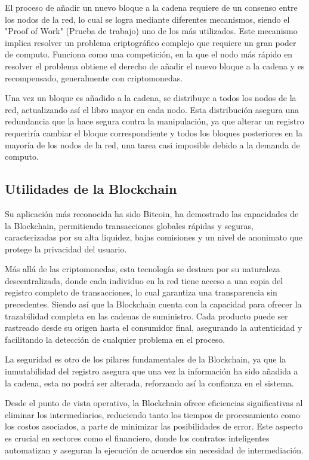 El proceso de añadir un nuevo bloque a la cadena requiere de un consenso entre los nodos de la red, lo cual se logra mediante diferentes mecanismos, siendo el "Proof of Work" (Prueba de trabajo) uno de los más utilizados. 
Este mecanismo implica resolver un problema criptográfico complejo que requiere un gran poder de computo. Funciona como una competición, en la que el nodo más rápido en resolver el problema obtiene el derecho de añadir el nuevo bloque a la cadena y es recompensado, generalmente con criptomonedas.

Una vez un bloque es añadido a la cadena, se distribuye a todos los nodos de la red, actualizando así el libro mayor en cada nodo. Esta distribución asegura una redundancia que la hace segura contra la manipulación, ya que alterar un registro requeriría cambiar el bloque correspondiente y todos los bloques posteriores en la mayoría de los nodos de la red, una tarea casi imposible debido a la demanda de computo.


\subsection{Utilidades de la Blockchain}

Su aplicación más reconocida ha sido Bitcoin, ha demostrado las capacidades de la Blockchain, permitiendo transacciones globales rápidas y seguras, caracterizadas por su alta liquidez, bajas comisiones y un nivel de anonimato que protege la privacidad del usuario.

Más allá de las criptomonedas, esta tecnología se destaca por su naturaleza descentralizada, donde cada individuo en la red tiene acceso a una copia del registro completo de transacciones, lo cual garantiza una transparencia sin precedentes. Siendo así que la Blockchain cuenta con la capacidad para ofrecer la trazabilidad completa en las cadenas de suministro. Cada producto puede ser rastreado desde su origen hasta el consumidor final, asegurando la autenticidad y facilitando la detección de cualquier problema en el proceso.

La seguridad es otro de los pilares fundamentales de la Blockchain, ya que la inmutabilidad del registro asegura que una vez la información ha sido añadida a la cadena, esta no podrá ser alterada, reforzando así la confianza en el sistema. 

Desde el punto de vista operativo, la Blockchain ofrece eficiencias significativas al eliminar los intermediarios, reduciendo tanto los tiempos de procesamiento como los costos asociados, a parte de minimizar las posibilidades de error.
Este aspecto es crucial en sectores como el financiero, donde los contratos inteligentes automatizan y aseguran la ejecución de acuerdos sin necesidad de intermediación.


